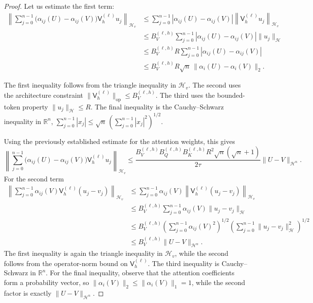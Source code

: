 \begin{proof}
Let us estimate the first term:
\[
\begin{aligned}
\left\|
\sum_{j=0}^{n-1}
\bigl(\alpha_{ij}(U)-\alpha_{ij}(V)\bigr)
\mathsf V_h^{(\ell)}u_j
\right\|_{\mathcal H_v}
&\leqslant
\sum_{j=0}^{n-1}
\left|
\alpha_{ij}(U)-\alpha_{ij}(V)
\right|
\left\|
\mathsf V_h^{(\ell)}u_j
\right\|_{\mathcal H_v}\\
&\leqslant
B_V^{(\ell,h)}
\sum_{j=0}^{n-1}
\left|
\alpha_{ij}(U)-\alpha_{ij}(V)
\right|
\|u_j\|_{\mathcal H}\\
&\leqslant
B_V^{(\ell,h)}R
\sum_{j=0}^{n-1}
\left|
\alpha_{ij}(U)-\alpha_{ij}(V)
\right|\\
&\leqslant
B_V^{(\ell,h)}R\sqrt n\,
\|\alpha_i(U)-\alpha_i(V)\|_2.
\end{aligned}
\]

The first inequality follows from the triangle inequality in \(\mathcal H_v\). The second uses the architecture constraint \(\|\mathsf V_h^{(\ell)}\|_{\mathrm{op}}\leqslant B_V^{(\ell,h)}\). The third uses the bounded-token property \(\|u_j\|_{\mathcal H}\leqslant R\). The final inequality is the Cauchy--Schwarz inequality in \(\mathbb R^n\), \(\sum_{j=0}^{n-1}|x_j|\leqslant\sqrt n\,(\sum_{j=0}^{n-1}|x_j|^2)^{1/2}\).

Using the previously established estimate for the attention weights, this gives
\[
\left\|
\sum_{j=0}^{n-1}
\bigl(\alpha_{ij}(U)-\alpha_{ij}(V)\bigr)
\mathsf V_h^{(\ell)}u_j
\right\|_{\mathcal H_v}
\leqslant
\frac{
B_V^{(\ell,h)}
B_Q^{(\ell,h)}
B_K^{(\ell,h)}
R^2
\sqrt n(\sqrt n+1)
}{
2\tau
}
\|U-V\|_{\mathcal H^n}.
\]
For the second term
\[
\begin{aligned}
\left\|
\sum_{j=0}^{n-1}
\alpha_{ij}(V)
\mathsf V_h^{(\ell)}(u_j-v_j)
\right\|_{\mathcal H_v}
&\leqslant
\sum_{j=0}^{n-1}
\alpha_{ij}(V)
\left\|
\mathsf V_h^{(\ell)}(u_j-v_j)
\right\|_{\mathcal H_v}\\
&\leqslant
B_V^{(\ell,h)}
\sum_{j=0}^{n-1}
\alpha_{ij}(V)
\|u_j-v_j\|_{\mathcal H}\\
&\leqslant
B_V^{(\ell,h)}
\left(
\sum_{j=0}^{n-1}
\alpha_{ij}(V)^2
\right)^{1/2}
\left(
\sum_{j=0}^{n-1}
\|u_j-v_j\|_{\mathcal H}^2
\right)^{1/2}\\
&\leqslant
B_V^{(\ell,h)}
\|U-V\|_{\mathcal H^n}.
\end{aligned}
\]
The first inequality is again the triangle inequality in \(\mathcal H_v\), while the second follows from the operator-norm bound on \(\mathsf V_h^{(\ell)}\). The third inequality is Cauchy--Schwarz in \(\mathbb R^n\). For the final inequality, observe that the attention coefficients form a probability vector, so \(\|\alpha_i(V)\|_2\leqslant\|\alpha_i(V)\|_1=1\), while the second factor is exactly \(\|U-V\|_{\mathcal H^n}\).


\end{proof}
